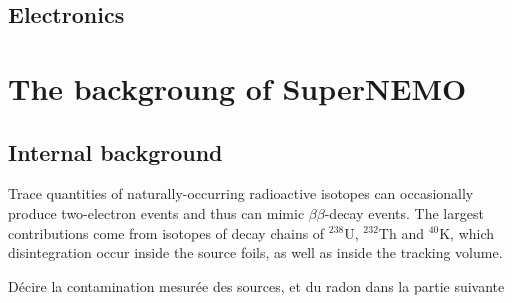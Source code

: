 \subsection{Electronics}

\section{The backgroung of SuperNEMO}
\label{sec:SNbkg}
\subsection{Internal background}
\label{subsec:SNbkg_internal}

Trace quantities of naturally-occurring radioactive isotopes can occasionally produce two-electron events and thus can mimic $\beta\beta$-decay events.
The largest contributions come from isotopes of decay chains of $^{238}$U, $^{232}$Th and $^{40}$K, which disintegration occur inside the source foils, as well as inside the tracking volume.

Décire la contamination mesurée des sources, et du radon dans la partie suivante

